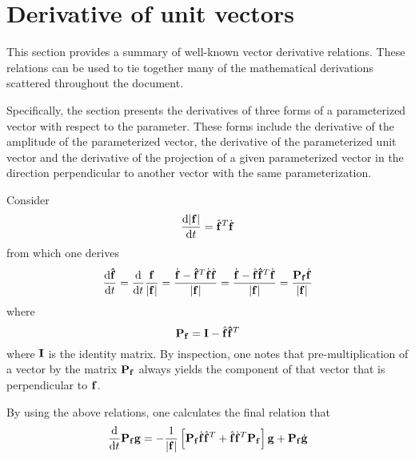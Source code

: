 \section{Derivative of unit vectors}
\label{an:vectorCalc}
This section provides a summary of well-known vector derivative relations. These relations can be used to tie together many of the mathematical derivations scattered throughout the document.
\par
Specifically, the section presents the derivatives of three forms of a parameterized vector with respect to the parameter. These forms include the derivative of the amplitude of the parameterized vector, the derivative of the parameterized unit vector and the derivative of the projection of a given parameterized vector in the direction perpendicular to another vector with the same parameterization.
\par
Consider
\begin{equation}
 \frac{\text{d}{\lvert\ensuremath{\mathbf{f}}\rvert}}{\text{d}{t}} = \hat{\mathbf{f}}^T\dot{\mathbf{f}}
\end{equation}
from which one derives
\begin{equation}
 \frac{\d{\vct{\hat{f}}}}{\d{t}} = \frac{\d{}}{\d{t}}\frac{\vct{f}}{\lvert\vct{f}\rvert} 
 = \frac{\dot{\vct{f}} - \vct{\hat{f}}^T\dot{\vct{f}}\hat{\vct{f}}}{\lvert\vct{f}\rvert}
 = \frac{\dot{\vct{f}} - \hat{\vct{f}}\vct{\hat{f}}^T\dot{\vct{f}}}{\lvert\vct{f}\rvert}
 = \frac{\mtx{P}_\vct{f}\dot{\vct{f}}}{\lvert\vct{f}\rvert}
\end{equation}
where
\begin{equation}
 \mtx{P}_\vct{f} = \mtx{I} - \hat{\vct{f}}\vct{\hat{f}}^T
\end{equation}
where $\mtx{I}$ is the identity matrix. By inspection, one notes that pre-multiplication of a vector by the matrix $\mtx{P}_\vct{f}$ always yields the component of that vector that is perpendicular to $\mathbf{f}$.
\par
By using the above relations, one calculates the final relation that
\begin{equation}
 \frac{\d{}}{\d{t}}\Pf\vct{g} = -\frac{1}{\lvert\vct{f}\rvert}\left[\Pf\df\uf^T + \uf\df^T\Pf\right]\vct{g} + \Pf\dot{\vct{g}}
\end{equation}

